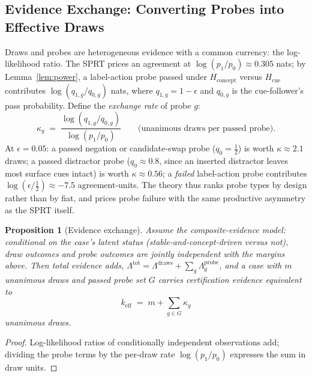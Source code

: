 \documentclass[11pt]{article}
\newtheorem{proposition}{Proposition}
\newcommand{\keff}{k_{\mathrm{eff}}}
\begin{document}
\subsection{Evidence Exchange: Converting Probes into Effective Draws}
\label{sec:method:exchange}

Draws and probes are heterogeneous evidence with a common currency: the
log-likelihood ratio. The SPRT prices an agreement at
$\log(p_1/p_0) \approx 0.305$ nats; by Lemma~\ref{lem:power}, a
label-action probe passed under $H_{\mathrm{concept}}$ versus
$H_{\mathrm{cue}}$ contributes $\log(q_{1,g}/q_{0,g})$ nats, where
$q_{1,g} = 1 - \epsilon$ and $q_{0,g}$ is the cue-follower's pass
probability. Define the \emph{exchange rate} of probe $g$:
\begin{equation}
  \kappa_g \;=\; \frac{\log\!\left(q_{1,g}/q_{0,g}\right)}
  {\log\!\left(p_1/p_0\right)}
  \qquad \text{(unanimous draws per passed probe).}
  \label{eq:kappa}
\end{equation}
At $\epsilon = 0.05$: a passed negation or candidate-swap probe
($q_0 = \tfrac12$) is worth $\kappa \approx 2.1$ draws; a passed
distractor probe ($q_0 \approx 0.8$, since an inserted distractor
leaves most surface cues intact) is worth $\kappa \approx 0.56$; a
\emph{failed} label-action probe contributes
$\log(\epsilon / \tfrac12) \approx -7.5$ agreement-units. The theory
thus ranks probe types by design rather than by fiat, and prices probe
failure with the same productive asymmetry as the SPRT itself.

\begin{proposition}[Evidence exchange]
\label{prop:exchange}
Assume the composite-evidence model: conditional on the case's latent
status (stable-and-concept-driven versus not), draw outcomes and probe
outcomes are jointly independent with the margins above. Then total
evidence adds, $\Lambda^{\mathrm{tot}} = \Lambda^{\mathrm{draws}} +
\sum_g \Lambda^{\mathrm{probe}}_g$, and a case with $m$ unanimous
draws and passed probe set $G$ carries certification evidence
equivalent to
\begin{equation}
  \keff \;=\; m + \sum_{g \in G} \kappa_g
  \label{eq:keff}
\end{equation}
unanimous draws.
\end{proposition}

\begin{proof}
Log-likelihood ratios of conditionally independent observations add;
dividing the probe terms by the per-draw rate $\log(p_1/p_0)$ expresses
the sum in draw units.
\end{proof}
\end{document}
